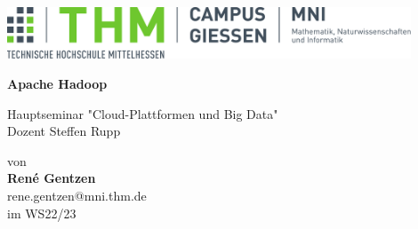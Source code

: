 \documentclass[%
	BCOR=8.25mm,         %
	DIV=12,              %
	parskip=half,				 %
	bibliography=totoc,	 %
	headsepline=on,      %
	]{scrbook}
\begin{document}
\frontmatter

\begin{titlepage}
	\begin{center}
	\includegraphics[width=0.9\textwidth]{img/mni-logo}
	
	\vspace{5cm}	

	\vspace{1cm}	

	\huge\textbf{\sffamily Apache Hadoop}

	\normalsize
	\vspace{1cm}	

	Hauptseminar "Cloud-Plattformen und Big Data" \\
	Dozent Steffen Rupp

	von \\[1cm]	

	\textbf{René Gentzen}\\ [.5cm] 
	rene.gentzen@mni.thm.de\\ [.5cm] 
	im WS22/23
	\end{center}
	\vfill
\end{titlepage}

\tableofcontents

\listoffigures
\listoftables
\lstlistoflistings

\mainmatter 
\pagestyle{headings}










\backmatter 

\appendix

\printbibliography
\end{document}
